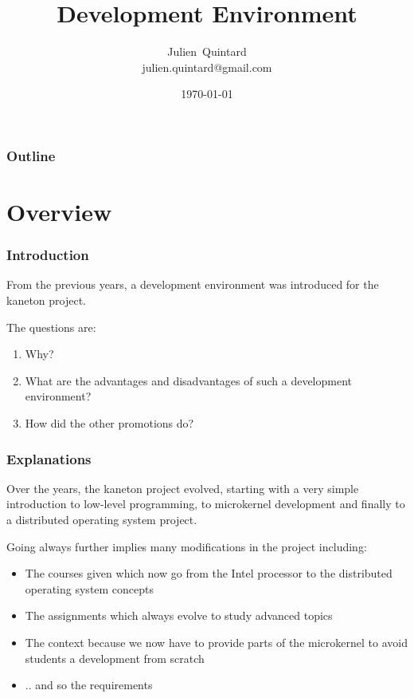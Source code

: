 \documentclass[8pt]{beamer}
\title{Development Environment}
\author
{
  Julien~Quintard\inst{1} \\
  {\tiny julien.quintard@gmail.com}
}
\institute
{
  \inst{1} kaneton distributed operating system project
}
\date{\today}
\newcommand{\nl}[0]{\vspace{0.4cm}}
\begin{document}
%
%

\begin{frame}
  \titlepage

  \begin{center}
     \hspace{0.1cm}  \hspace{0.1cm}
     \hspace{0.1cm}
  \end{center}
\end{frame}

%
%

\begin{frame}
  \frametitle{Outline}
  \tableofcontents
\end{frame}

%
%

\section{Overview}


\begin{frame}
  \frametitle{Introduction}

  From the previous years, a development environment was introduced
  for the kaneton project.

  \nl

  The questions are:

  \begin{enumerate}
    \item
      Why?
    \item
      What are the advantages and disadvantages of such a
      development environment?
    \item
      How did the other promotions do?
  \end{enumerate}
\end{frame}


\begin{frame}
  \frametitle{Explanations}

  Over the years, the kaneton project evolved, starting with a very
  simple introduction to low-level programming, to microkernel
  development and finally to a distributed operating system project.

  \nl

  Going always further implies many modifications in the project
  including:

  \begin{itemize}[<+->]
    \item
      The courses given which now go from the Intel processor to
      the distributed operating system concepts
    \item
      The assignments which always evolve to study advanced topics
    \item
      The context because we now have to provide parts of the microkernel
      to avoid students a development from scratch
    \item
      .. and so the requirements
  \end{itemize}
\end{frame}
\end{document}
